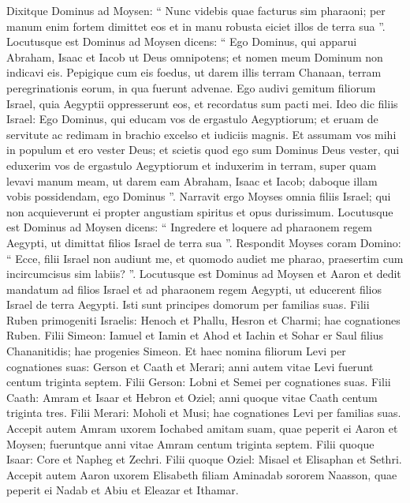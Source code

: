 \begin{biblechapter}
\begin{biblechapter}
\begin{biblechapter}
\begin{biblechapter}
\begin{biblechapter}
\begin{biblechapter}
\verse Dixitque Dominus ad Moysen: “ Nunc videbis quae facturus sim pharaoni; per manum enim fortem dimittet eos et in manu robusta eiciet illos de terra sua ”.
 \verse Locutusque est Dominus ad Moysen dicens: “ Ego Dominus, 
\verse qui apparui Abraham, Isaac et Iacob ut Deus omnipotens; et nomen meum Dominum non indicavi eis. 
\verse Pepigique cum eis foedus, ut darem illis terram Chanaan, terram peregrinationis eorum, in qua fuerunt advenae. 
\verse Ego audivi gemitum filiorum Israel, quia Aegyptii oppresserunt eos, et recordatus sum pacti mei. 
\verse Ideo dic filiis Israel: Ego Dominus, qui educam vos de ergastulo Aegyptiorum; et eruam de servitute ac redimam in brachio excelso et iudiciis magnis. 
\verse Et assumam vos mihi in populum et ero vester Deus; et scietis quod ego sum Dominus Deus vester, qui eduxerim vos de ergastulo Aegyptiorum 
\verse et induxerim in terram, super quam levavi manum meam, ut darem eam Abraham, Isaac et Iacob; daboque illam vobis possidendam, ego Dominus ”.
 \verse Narravit ergo Moyses omnia filiis Israel; qui non acquieverunt ei propter angustiam spiritus et opus durissimum. 
\verse Locutusque est Dominus ad Moysen dicens: 
\verse “ Ingredere et loquere ad pharaonem regem Aegypti, ut dimittat filios Israel de terra sua ”. 
\verse Respondit Moyses coram Domino: “ Ecce, filii Israel non audiunt me, et quomodo audiet me pharao, praesertim cum incircumcisus sim labiis? ”.
 \verse Locutusque est Dominus ad Moysen et Aaron et dedit mandatum ad filios Israel et ad pharaonem regem Aegypti, ut educerent filios Israel de terra Aegypti.
 \verse Isti sunt principes domorum per familias suas.
 Filii Ruben primogeniti Israelis: Henoch et Phallu, Hesron et Charmi; hae cognationes Ruben.
 \verse Filii Simeon: Iamuel et Iamin et Ahod et Iachin et Sohar er Saul filius Chananitidis; hae progenies Simeon.
 \verse Et haec nomina filiorum Levi per cognationes suas: Gerson et Caath et Merari; anni autem vitae Levi fuerunt centum triginta septem.
 \verse Filii Gerson: Lobni et Semei per cognationes suas.
 \verse Filii Caath: Amram et Isaar et Hebron et Oziel; anni quoque vitae Caath centum triginta tres.
 \verse Filii Merari: Moholi et Musi; hae cognationes Levi per familias suas.
 \verse Accepit autem Amram uxorem Iochabed amitam suam, quae peperit ei Aaron et Moysen; fueruntque anni vitae Amram centum triginta septem.
 \verse Filii quoque Isaar: Core et Napheg et Zechri.
 \verse Filii quoque Oziel: Misael et Elisaphan et Sethri.
 \verse Accepit autem Aaron uxorem Elisabeth filiam Aminadab sororem Naasson, quae peperit ei Nadab et Abiu et Eleazar et Ithamar.

\end{biblechapter}
\end{biblechapter}
\end{biblechapter}
\end{biblechapter}
\end{biblechapter}
\end{biblechapter}
